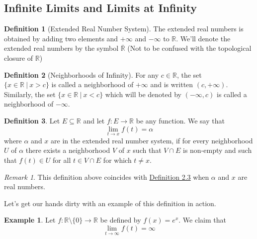 \documentclass[12pt]{article}
\theoremstyle{definition}
\newtheorem{definition}{Definition}[section]
\numberwithin{definition}{subsection}
\numberwithin{theorem}{subsection}
\numberwithin{corollary}{subsection}
\newtheorem{example}{Example}
\numberwithin{example}{subsection}
\theoremstyle{remark}
\newtheorem*{remark}{Remark}
\theoremstyle{point}
\newcommand{\R}{\mathbb{R}}
\begin{document}
	  \newpage
	 
	 \subsection{Infinite Limits and Limits at Infinity}
	 
	 
	 \begin{definition}[Extended Real Number System]
	 	The extended real numbers is obtained by adding two elements and $+\infty$ and $-\infty$ to $\R$. We'll denote the extended real numbers by the symbol $\overline{\R}$ (Not to be confused with the topological closure of $\R$)
	 \end{definition}
	 
	 
	 \begin{definition}[Neighborhoods of Infinity]
	 	For any $c \in \R$, the set\\ $\{x \in \R \ | \ x > c\}$ is called a neighborhood of $+\infty$ and is written $(c, +\infty)$. Similarly, the set $\{ x \in \R \ | \ x < c\}$ which will be denoted by $(-\infty, c)$ is called a neighborhood of $-\infty$.
	 \end{definition}
	 
	 
	 \begin{definition}
	 	Let $E \subseteq \R$ and let $f : E \to \R$ be any function. We say that $$\lim_{t \to x}f(t) = \alpha$$ where $\alpha$ and $x$ are in the extended real number system, if for every neighborhood $U$ of $\alpha$ there exists a neighborhood $V$ of $x$ such that $V \cap E$ is non-empty and such that $f(t) \in U$ for all $t \in V \cap E$ for which $t \neq x$.
	 \end{definition}
	 
	 
	 \begin{remark}
	 	This definition above coincides with \hyperlink{limit-function-defn}{Definition 2.3} when $\alpha$ and $x$ are real numbers.
	 \end{remark}
	 
	 Let's get our hands dirty with an example of this definition in action.
	 
	 \begin{example}
	 	Let $f : \R \setminus \{0\} \to \R$ be defined by $f(x) = e^x$. We claim that $$\lim_{t \to \infty} f(t) = \infty$$
	 \end{example}
	 
\end{document}
